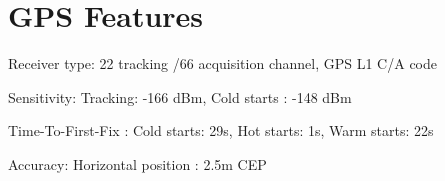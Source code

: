 \section*{GPS Features}
\begin{flushleft}
	\item Receiver type: 22 tracking /66 acquisition channel, GPS L1 C/A code
	\item Sensitivity: Tracking: -166 dBm, Cold starts : -148 dBm
	\item Time-To-First-Fix : Cold starts: 29s, Hot starts: 1s, Warm starts:  22s 
	\item Accuracy: Horizontal position :  2.5m CEP
\end{flushleft}